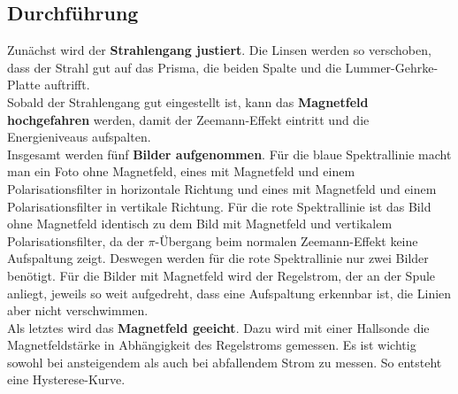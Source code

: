 \subsection{Durchführung}
Zunächst wird der \textbf{Strahlengang justiert}. Die Linsen werden so verschoben, dass der Strahl gut auf das Prisma, die beiden Spalte und die Lummer-Gehrke-Platte auftrifft. \\
Sobald der Strahlengang gut eingestellt ist, kann das \textbf{Magnetfeld hochgefahren} werden, damit der Zeemann-Effekt eintritt und die Energieniveaus aufspalten. \\
Insgesamt werden fünf \textbf{Bilder aufgenommen}. Für die blaue Spektrallinie macht man ein Foto ohne Magnetfeld, eines mit Magnetfeld und einem Polarisationsfilter in horizontale Richtung und eines mit Magnetfeld und einem Polarisationsfilter in vertikale Richtung. Für die rote Spektrallinie ist das Bild ohne Magnetfeld identisch zu dem Bild mit Magnetfeld und vertikalem Polarisationsfilter, da der $\pi$-Übergang beim normalen Zeemann-Effekt keine Aufspaltung zeigt. Deswegen werden für die rote Spektrallinie nur zwei Bilder benötigt. Für die Bilder mit Magnetfeld wird der Regelstrom, der an der Spule anliegt, jeweils so weit aufgedreht, dass eine Aufspaltung erkennbar ist, die Linien aber nicht verschwimmen. \\
Als letztes wird das \textbf{Magnetfeld geeicht}. Dazu wird mit einer Hallsonde die Magnetfeldstärke in Abhängigkeit des Regelstroms gemessen. Es ist wichtig sowohl bei ansteigendem als auch bei abfallendem Strom zu messen. So entsteht eine Hysterese-Kurve.